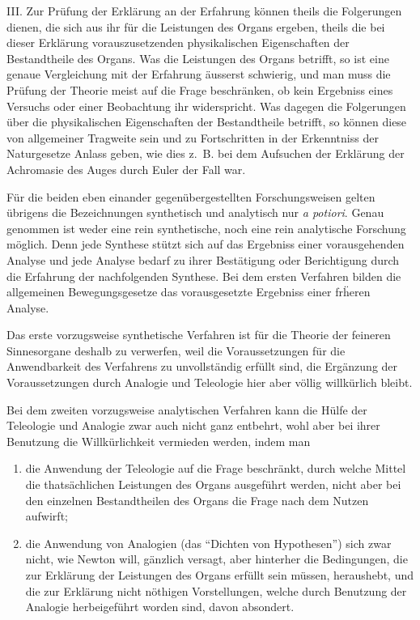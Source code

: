 \documentclass[12pt,a4paper]{article}
\begin{document}
III. Zur Pr\"ufung der Erkl\"arung an der Erfahrung k\"onnen theils die Folgerungen dienen, die sich aus ihr f\"ur die Leistungen des Organs ergeben, theils die bei dieser Erkl\"arung vorauszusetzenden physikalischen Eigenschaften der Bestandtheile des Organs. Was die Leistungen des Organs betrifft, so ist eine genaue Vergleichung mit der Erfahrung \"ausserst schwierig, und man muss die Pr\"ufung der Theorie meist auf die Frage beschr\"anken, ob kein Ergebniss eines Versuchs oder einer Beobachtung ihr widerspricht. Was dagegen die Folgerungen \"uber die physikalischen Eigenschaften der Bestandtheile betrifft, so k\"onnen diese von allgemeiner Tragweite sein und zu Fortschritten in der Erkenntniss der Naturgesetze Anlass geben, wie dies z.~B. bei dem Aufsuchen der Erkl\"arung der Achromasie des Auges durch Euler der Fall war.

F\"ur die beiden eben einander gegen\"ubergestellten Forschungsweisen gelten \"ubrigens die Bezeichnungen synthetisch und analytisch nur \emph{a potiori}. Genau genommen ist weder eine rein synthetische, noch eine rein analytische Forschung m\"oglich. Denn jede Synthese st\"utzt sich auf das Ergebniss einer vorausgehenden Analyse und jede Analyse bedarf zu ihrer Best\"atigung oder Berichtigung durch die Erfahrung der nachfolgenden Synthese. Bei dem ersten Verfahren bilden die allgemeinen Bewegungsgesetze das vorausgesetzte Ergebniss einer fr\"heren Analyse.

Das erste vorzugsweise synthetische Verfahren ist f\"ur die Theorie der feineren Sinnesorgane deshalb zu verwerfen, weil die Voraussetzungen f\"ur die Anwendbarkeit des Verfahrens zu unvollst\"andig erf\"ullt sind, die Erg\"anzung der Voraussetzungen durch Analogie und Teleologie hier aber v\"ollig willk\"urlich bleibt.

Bei dem zweiten vorzugsweise analytischen Verfahren kann die H\"ulfe der Teleologie und Analogie zwar auch nicht ganz entbehrt, wohl aber bei ihrer Benutzung die Willk\"urlichkeit vermieden werden, indem man

\begin{enumerate}
\item die Anwendung der Teleologie auf die Frage beschr\"ankt, durch welche Mittel die thats\"achlichen Leistungen des Organs ausgef\"uhrt werden, nicht aber bei den einzelnen Bestandtheilen des Organs die Frage nach dem Nutzen aufwirft;
\item die Anwendung von Analogien (das ``Dichten von Hypothesen'') sich zwar nicht, wie Newton will, g\"anzlich versagt, aber hinterher die Bedingungen, die zur Erkl\"arung der Leistungen des Organs erf\"ullt sein m\"ussen, heraushebt, und die zur Erkl\"arung nicht n\"othigen Vorstellungen, welche durch Benutzung der Analogie herbeigef\"uhrt worden sind, davon absondert.
\end{enumerate}
\end{document}

